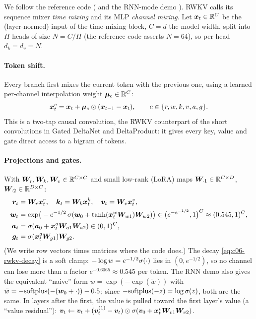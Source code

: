We follow the reference code
( and the RNN-mode demo
). RWKV calls its
sequence mixer \emph{time mixing} and its MLP \emph{channel mixing}. Let
$\bm{x}_t\in\mathbb{R}^{C}$ be the (layer-normed) input of the time-mixing block, $C=d$ the model
width, split into $H$ heads of size $N=C/H$ (the reference code asserts $N=64$), so per head
$d_k=d_v=N$.

\paragraph{Token shift.} Every branch first mixes the current token with the previous one,
using a learned per-channel interpolation weight $\bm\mu_c\in\mathbb{R}^C$:
\begin{equation}\label{eq:c06-tokenshift}
  \bm{x}^{c}_t=\bm{x}_t+\bm\mu_c\odot(\bm{x}_{t-1}-\bm{x}_t),\qquad c\in\{r,w,k,v,a,g\}.
\end{equation}
This is a two-tap causal convolution, the RWKV counterpart of the short convolutions in
Gated DeltaNet and DeltaProduct: it gives every key, value and gate direct access to a
bigram of tokens.

\paragraph{Projections and gates.} With $\bm{W}_r,\bm{W}_k,\bm{W}_v\in\mathbb{R}^{C\times C}$ and small
low-rank (LoRA) maps $\bm{W}_{\cdot1}\in\mathbb{R}^{C\times D}$, $\bm{W}_{\cdot2}\in\mathbb{R}^{D\times C}$:
\begin{align}
  \bm{r}_t&=\bm{W}_r\bm{x}^r_t,\quad \bm{k}_t=\bm{W}_k\bm{x}^k_t,\quad \bm{v}_t=\bm{W}_v\bm{x}^v_t,\\
  \bm{w}_t&=\exp\!\big(-e^{-1/2}\,\sigma(\bm{w}_0+\tanh(\bm{x}^w_t\bm{W}_{w1})\bm{W}_{w2})\big)
        \in\big(e^{-e^{-1/2}},1\big)^C\approx(0.545,1)^C, \label{eq:c06-rwkv-decay}\\
  \bm{a}_t&=\sigma(\bm{a}_0+\bm{x}^a_t\bm{W}_{a1}\bm{W}_{a2})\in(0,1)^C,\\
  \bm{g}_t&=\sigma(\bm{x}^g_t\bm{W}_{g1})\bm{W}_{g2}.
\end{align}
(We write row vectors times matrices where the code does.) The decay
\eqref{eq:c06-rwkv-decay} is a soft clamp: $-\log w=e^{-1/2}\sigma(\cdot)$ lies in
$(0,e^{-1/2})$, so no channel can lose more than a factor $e^{-0.6065}\approx0.545$ per token.
The RNN demo also gives the equivalent ``naive'' form $w=\exp(-\exp(\tilde w))$ with
$\tilde w=-\mathrm{softplus}(-(\bm{w}_0+\cdot))-0.5$; since $-\mathrm{softplus}(-z)=\log\sigma(z)$,
both are the same. In layers after the first, the value is pulled toward the first layer's
value (a ``value residual''):
$\bm{v}_t\gets\bm{v}_t+(\bm{v}^{(1)}_t-\bm{v}_t)\odot\sigma(\bm{v}_0+\bm{x}^v_t\bm{W}_{v1}\bm{W}_{v2})$.

